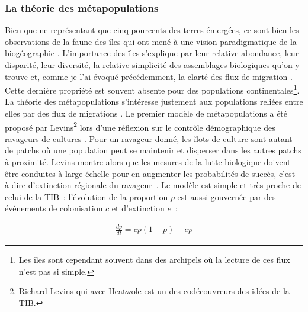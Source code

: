 \subsubsection*{La théorie des
métapopulations}\label{la-thuxe9orie-des-muxe9tapopulations}

Bien que ne représentant que cinq pourcents des terres émergées, ce sont
bien les observations de la faune des îles qui ont mené à une vision
paradigmatique de la biogéographie \citep{Simberloff1974a}. L'importance
des îles s'explique par leur relative abondance, leur disparité, leur
diversité, la relative simplicité des assemblages biologiques qu'on y
trouve et, comme je l'ai évoqué précédemment, la clarté des flux de
migration \citep{Simberloff1974a}. Cette dernière propriété est souvent
absente pour des populations continentales\footnote{Les îles sont
  cependant souvent dans des archipels où la lecture de ces flux n'est
  pas si simple.}. La théorie des métapopulations s'intéresse justement
aux populations reliées entre elles par des flux de migrations
\citep{Hanski2010}. Le premier modèle de métapopulations a été proposé
par Levins\footnote{Richard Levins qui avec Heatwole est un des
  codécouvreurs des idées de la TIB.} lors d'une réflexion sur le
contrôle démographique des ravageurs de cultures \citep{Levins1969}.
Pour un ravageur donné, les îlots de culture sont autant de patchs où
une population peut se maintenir et disperser dans les autres patchs à
proximité. Levins montre alors que les mesures de la lutte biologique
doivent être conduites à large échelle pour en augmenter les
probabilités de succès, c'est-à-dire d'extinction régionale du
ravageur~\citep{Levins1969}. Le modèle est simple et très proche de
celui de la TIB~: l'évolution de la proportion \(p\) est aussi gouvernée
par des événements de colonisation \(c\) et d'extinction \(e\)~:

\begin{eqnarray}
\label{eqMW}
\frac{dp}{dt} = cp(1-p)-ep
\end{eqnarray}

